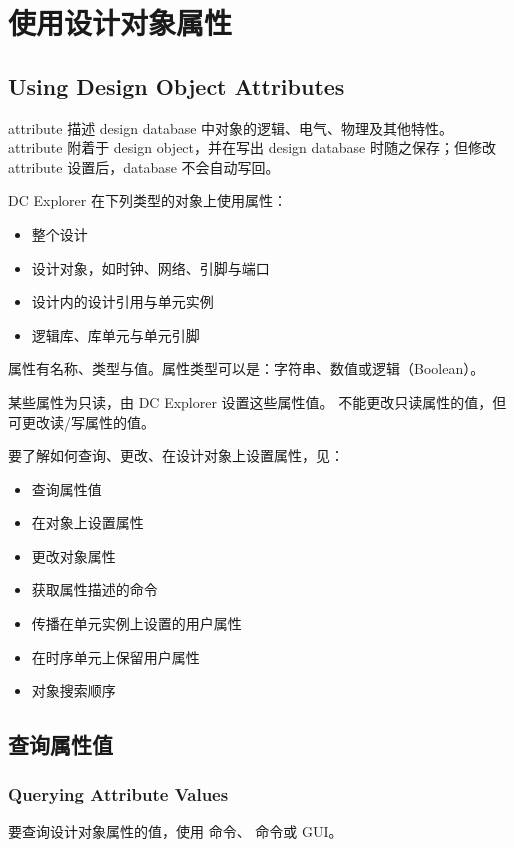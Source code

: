 \section{使用设计对象属性}
\subsection*{Using Design Object Attributes}

attribute 描述 design database 中对象的逻辑、电气、物理及其他特性。
attribute 附着于 design object，并在写出 design database 时随之保存；但修改 attribute 设置后，database 不会自动写回。

DC Explorer 在下列类型的对象上使用属性：
\begin{itemize}
  \item 整个设计
  \item 设计对象，如时钟、网络、引脚与端口
  \item 设计内的设计引用与单元实例
  \item 逻辑库、库单元与单元引脚
\end{itemize}

属性有名称、类型与值。属性类型可以是：字符串、数值或逻辑（Boolean）。

某些属性为只读，由 DC Explorer 设置这些属性值。
不能更改只读属性的值，但可更改读/写属性的值。

要了解如何查询、更改、在设计对象上设置属性，见：
\begin{itemize}
  \item 查询属性值
  \item 在对象上设置属性
  \item 更改对象属性
  \item 获取属性描述的命令
  \item 传播在单元实例上设置的用户属性
  \item 在时序单元上保留用户属性
  \item 对象搜索顺序
\end{itemize}

\subsection{查询属性值}
\subsubsection*{Querying Attribute Values}

要查询设计对象属性的值，使用  命令、 命令或 GUI。

